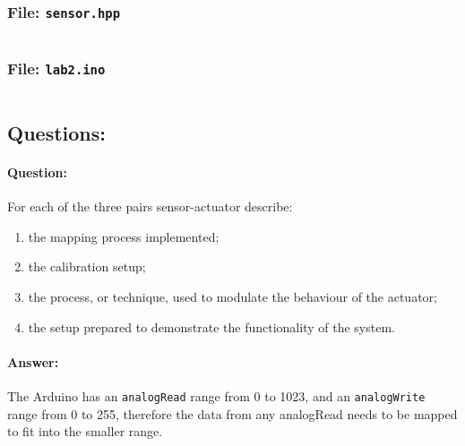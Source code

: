 \documentclass[10pt]{article}
\begin{document}
\subsubsection{File: \texttt{sensor.hpp}}

\inputminted{arduino}{../sensor.hpp}

\subsubsection{File: \texttt{lab2.ino}}
\inputminted{arduino}{../lab2.ino}

\subsection{Questions:}

\paragraph{Question:}

For each of the three pairs sensor-actuator describe:

\begin{enumerate}
    \item the mapping process implemented;
    \item the calibration setup;
    \item the process, or technique, used to modulate the behaviour of the
        actuator;
    \item the setup prepared to demonstrate the functionality of the system.
\end{enumerate}

\paragraph{Answer:}

The Arduino has an \texttt{analogRead} range from 0 to 1023, and an
\texttt{analogWrite} range from 0 to 255, therefore the data from any analogRead
needs to be mapped to fit into the smaller range.
\end{document}
